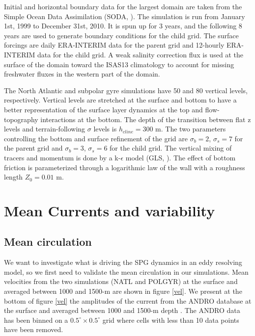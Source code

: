 \documentclass[11pt,a4paper]{article}
\begin{document}
Initial and horizontal boundary data for the largest domain are taken from the Simple Ocean Data Assimilation (SODA, \citet{carton2008}). The simulation is run from January 1st, 1999 to December 31st, 2010. It is spun up for 3 years, and the following 8 years are used to generate boundary conditions for the child grid. The surface forcings are daily ERA-INTERIM data for the parent grid and 12-hourly ERA-INTERIM data for the child grid. A weak salinity correction flux is used at the surface of the domain toward the ISAS13 climatology \citep{gaillard2016} to account for missing freshwater fluxes in the western part of the domain.


The North Atlantic and subpolar gyre simulations have 50 and 80 vertical levels, respectively. Vertical levels are stretched at the surface and bottom \citep{lemarie2012} to have a better representation of the surface layer dynamics at the top and flow-topography interactions at the bottom. The depth of the transition between flat z levels and terrain-following $\sigma$ levels is $h_{cline} = 300$ m. The two parameters controlling the bottom and surface refinement of the grid are $\sigma _b=2$, $\sigma _s=7$ for the parent grid and $\sigma _b=3$, $\sigma _s=6$ for the child grid. The vertical mixing of tracers and momentum is done by a k-$\epsilon$ model (GLS, \citet{umlauf2003}). The effect of bottom friction is parameterized through a logarithmic law of the wall with a roughness length $Z_{0} = 0.01$ m.

\section{Mean Currents and variability}
\subsection{Mean circulation}


We want to investigate what is driving the SPG dynamics in an eddy resolving model, so we first need to validate the mean circulation in our simulations. Mean velocities from the two simulations (NATL and POLGYR) at the surface and averaged between 1000 and 1500-m are shown in figure \ref{vel}. We present at the bottom of figure \ref{vel} the amplitudes of the current from the ANDRO database at the surface and averaged between 1000 and 1500-m depth \citep{ollitrault2013,lebedev2007}. The ANDRO data has been binned on a $0.5^{\circ}\times 0.5^{\circ}$ grid where cells with less than 10 data points have been removed. 
\end{document}
